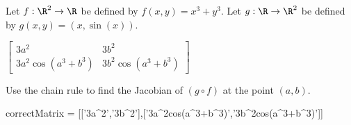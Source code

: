 \documentclass{ximera}
\begin{document}
	\begin{question}
		Let $f:\R^2 \to \R$ be defined by $f(x,y)=x^3+y^3$.  Let 
		$g:\R \to \R^2$ be defined by $g(x,y) = (x, \sin(x))$.  
		\begin{solution}
			\begin{hint}
				\(\begin{bmatrix} 
				3a^2& 3b^2\\
				3a^2\cos(a^3+b^3)& 3b^2\cos(a^3+b^3)
				\end{bmatrix}\)
			\end{hint}
		Use the chain rule to find the
		Jacobian of $(g \circ f)$ at the point $(a,b)$.
		
		\begin{matrix-answer}
			correctMatrix = [['3a^2','3b^2'],['3a^2cos(a^3+b^3)','3b^2cos(a^3+b^3)']]
		\end{matrix-answer}
		\end{solution}
	\end{question}	
	
\end{document}
